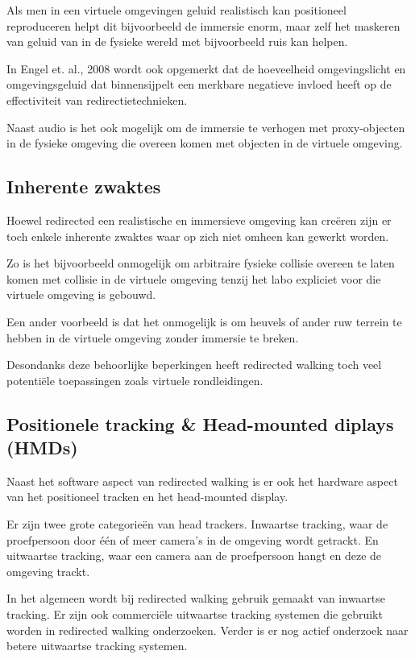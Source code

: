 \documentclass[a4paper,12pt]{article}
\begin{document}
Als men in een virtuele omgevingen geluid realistisch kan positioneel
reproduceren helpt dit bijvoorbeeld de immersie enorm\cite{lackner77}, maar zelf
het maskeren van geluid van in de fysieke wereld met bijvoorbeeld ruis kan
helpen\cite{usoh99}.

In Engel et. al., 2008\cite{engel08} wordt ook opgemerkt dat de hoeveelheid 
omgevingslicht en omgevingsgeluid dat binnensijpelt een merkbare negatieve 
invloed heeft op de effectiviteit van redirectietechnieken.

Naast audio is het ook mogelijk om de immersie te verhogen met proxy-objecten in
de fysieke omgeving die overeen komen met objecten in de virtuele 
omgeving\cite{steinicke09}.


\subsection{Inherente zwaktes}
Hoewel redirected een realistische en immersieve omgeving kan cre\"eren zijn er
toch enkele inherente zwaktes waar op zich niet omheen kan gewerkt worden.

Zo is het bijvoorbeeld onmogelijk om arbitraire fysieke collisie overeen te laten
komen met collisie in de virtuele omgeving tenzij het labo expliciet voor die
virtuele omgeving is gebouwd.

Een ander voorbeeld is dat het onmogelijk is om heuvels of ander ruw terrein te
hebben in de virtuele omgeving zonder immersie te breken.

Desondanks deze behoorlijke beperkingen heeft redirected walking toch veel
potenti\"ele toepassingen zoals virtuele rondleidingen.


\subsection{Positionele tracking \& Head-mounted diplays (HMDs)}
Naast het software aspect van redirected walking is er ook het hardware aspect
van het positioneel tracken en het head-mounted display.

Er zijn twee grote categorie\"en van head trackers. Inwaartse tracking, waar de
proefpersoon door \'e\'en of meer camera's in de omgeving wordt getrackt. En
uitwaartse tracking, waar een camera aan de proefpersoon hangt en deze de
omgeving trackt.

In het algemeen wordt bij redirected walking gebruik gemaakt van inwaartse 
tracking\cite{bruder08,engel08,steinicke09,kohn01,neth12,ward92}. Er zijn ook 
commerci\"ele uitwaartse tracking systemen die gebruikt worden in redirected
walking onderzoeken\cite{peck09,suma11}. Verder is er nog actief onderzoek naar
betere uitwaartse tracking systemen\cite{maesen13}.
\end{document}
